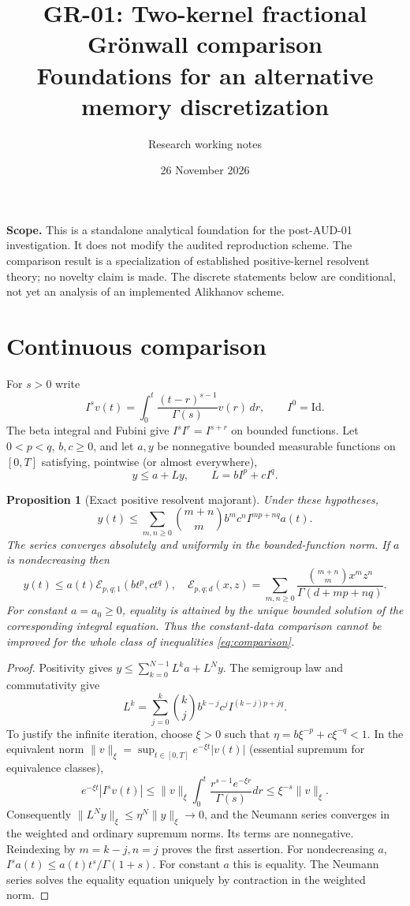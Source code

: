 \documentclass[11pt,a4paper]{article}
\title{GR-01: Two-kernel fractional Gr\"onwall comparison\\\large Foundations for an alternative memory discretization}
\author{Research working notes}
\date{26 November 2026}
\newtheorem{proposition}{Proposition}[section]
\newcommand{\norm}[1]{\lVert#1\rVert}
\newcommand{\ML}{\mathcal E}
\begin{document}
\maketitle
\noindent\textbf{Scope.} This is a standalone analytical foundation for the post-AUD-01 investigation. It does not modify the audited reproduction scheme. The comparison result is a specialization of established positive-kernel resolvent theory; no novelty claim is made. The discrete statements below are conditional, not yet an analysis of an implemented Alikhanov scheme.
\section{Continuous comparison}
For $s>0$ write
\[
 I^s v(t)=\int_0^t \frac{(t-r)^{s-1}}{\Gamma(s)}v(r)\,dr,
 \qquad I^0=\mathrm{Id}.
\]
The beta integral and Fubini give $I^sI^r=I^{s+r}$ on bounded functions. Let $0<p<q$, $b,c\ge0$, and let $a,y$ be nonnegative bounded measurable functions on $[0,T]$ satisfying, pointwise (or almost everywhere),
\begin{equation}y\le a+Ly,\qquad L=bI^p+cI^q.\label{eq:comparison}\end{equation}
\begin{proposition}[Exact positive resolvent majorant]
Under these hypotheses,
\[
 y(t)\le\sum_{m,n\ge0}\binom{m+n}{m}b^m c^n I^{mp+nq}a(t).
\]
The series converges absolutely and uniformly in the bounded-function norm. If $a$ is nondecreasing then
\begin{equation}
 y(t)\le a(t)\ML_{p,q;1}(bt^p,ct^q),\quad
 \ML_{p,q;d}(x,z)=\sum_{m,n\ge0}\frac{\binom{m+n}{m}x^mz^n}{\Gamma(d+mp+nq)}.
 \label{eq:ML}
\end{equation}
For constant $a=a_0\ge0$, equality is attained by the unique bounded solution of the corresponding integral equation. Thus the constant-data comparison cannot be improved for the whole class of inequalities \eqref{eq:comparison}.
\end{proposition}
\begin{proof}
Positivity gives $y\le\sum_{k=0}^{N-1}L^ka+L^Ny$. The semigroup law and commutativity give
\[
 L^k=\sum_{j=0}^k\binom{k}{j}b^{k-j}c^j I^{(k-j)p+jq}.
\]
To justify the infinite iteration, choose $\xi>0$ such that $\eta=b\xi^{-p}+c\xi^{-q}<1$. In the equivalent norm $\norm{v}_\xi=\sup_{t\in[0,T]}e^{-\xi t}|v(t)|$ (essential supremum for equivalence classes),
\[
 e^{-\xi t}|I^s v(t)|\le\norm{v}_\xi\int_0^t\frac{r^{s-1}e^{-\xi r}}{\Gamma(s)}dr\le \xi^{-s}\norm{v}_\xi.
\]
Consequently $\norm{L^N y}_\xi\le\eta^N\norm{y}_\xi\to0$, and the Neumann series converges in the weighted and ordinary supremum norms. Its terms are nonnegative. Reindexing by $m=k-j,n=j$ proves the first assertion. For nondecreasing $a$, $I^s a(t)\le a(t)t^s/\Gamma(1+s)$. For constant $a$ this is equality. The Neumann series solves the equality equation uniquely by contraction in the weighted norm.
\end{proof}
\end{document}
